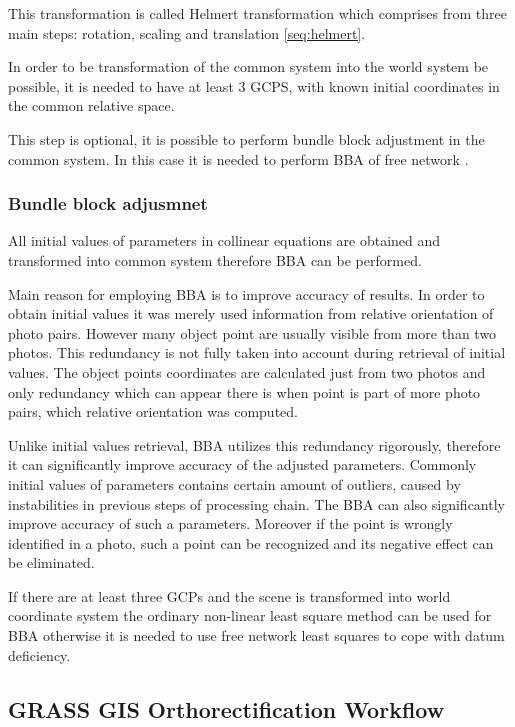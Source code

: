 \documentclass[a4paper,12pt]{article}
\begin{document}
This transformation is called Helmert  transformation which comprises from 
three main steps: rotation, scaling and translation \ref{seq:helmert}.

In order to be transformation of the common system into the world system be possible, it is needed 
to have at least 3 GCPS, with known initial coordinates in the common relative space. 
 
This step is optional, it is possible to perform bundle block adjustment in the common system. In this 
case it is needed to perform BBA of free network \label{sec:free_net_least}. 

\subsubsection{Bundle block adjusmnet}

All initial values of parameters in collinear equations are obtained and transformed into common system therefore 
BBA can be performed.

Main reason for employing BBA is to improve accuracy of results.
In order to obtain initial values it was merely used information from relative orientation of photo pairs.
However many object point are usually visible from more than two photos. This redundancy is not fully taken 
into account during retrieval of initial values. The object points coordinates are calculated 
just from two photos and only redundancy which can appear there is when point is part of more 
photo pairs, which relative orientation was computed. 

Unlike initial values retrieval, BBA utilizes this redundancy rigorously, therefore 
it can significantly improve accuracy of the adjusted parameters.
Commonly initial values of parameters contains certain amount of outliers, caused by instabilities in previous steps of processing chain.
The BBA can also significantly improve accuracy of such a parameters.
Moreover if the point is wrongly identified in a photo, such a point can be recognized and its 
negative effect can be eliminated.

If  there are at least three GCPs and the scene is transformed into world coordinate system the ordinary non-linear least square method \label{sec:non_least} 
can be used for BBA otherwise
it is needed to use free network least squares \label{sec:free_net_least} to cope with datum deficiency. 

\subsection{GRASS GIS Orthorectification Workflow}
\end{document}
